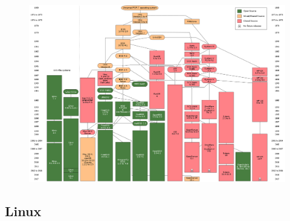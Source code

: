 \documentclass[xcolor=dvipsnames,aspectratio=169]{beamer}
\begin{document}
\begin{frame}
\begin{figure}
 \vspace*{-.25cm} 
\includegraphics[scale=0.22]{unix_hist}
\end{figure}
\end{frame}

\subsection{Linux}
\end{document}
